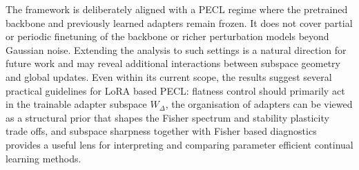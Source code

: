 \documentclass[10pt]{article} %
\begin{document}
The framework is deliberately aligned with a PECL regime where the pretrained backbone and previously learned adapters remain frozen. It does not cover partial or periodic finetuning of the backbone or richer perturbation models beyond Gaussian noise. Extending the analysis to such settings is a natural direction for future work and may reveal additional interactions between subspace geometry and global updates. Even within its current scope, the results suggest several practical guidelines for LoRA based PECL: flatness control should primarily act in the trainable adapter subspace $W_\Delta$, the organisation of adapters can be viewed as a structural prior that shapes the Fisher spectrum and stability plasticity trade offs, and subspace sharpness together with Fisher based diagnostics provides a useful lens for interpreting and comparing parameter efficient continual learning methods.






\end{document}
